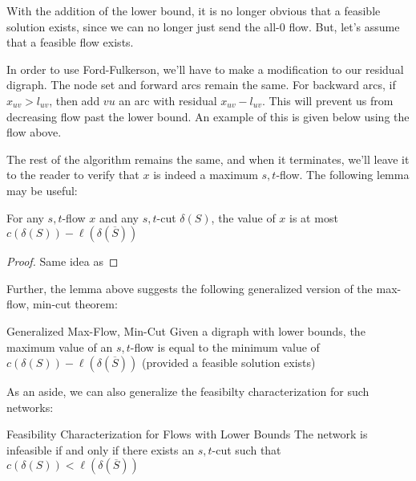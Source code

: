 With the addition of the lower bound, it is no longer obvious that a feasible solution exists, since we can no longer just send the all-$0$ flow.
But, let's assume that a feasible flow exists.

In order to use Ford-Fulkerson, we'll have to make a modification to our residual digraph.
The node set and forward arcs remain the same.
For backward arcs, if $x_{uv} > l_{uv}$, then add $vu$ an arc with residual $x_{uv} - l_{uv}$.
This will prevent us from decreasing flow past the lower bound.
An example of this is given below using the flow above.

\begin{minipage}{\textwidth}
    \centering
\end{minipage}

The rest of the algorithm remains the same, and when it terminates, we'll leave it to the reader to verify that $x$ is indeed a maximum $s,t$-flow.
The following lemma may be useful:
\begin{lemma}{}{}
    For any $s,t$-flow $x$ and any $s,t$-cut $\delta(S)$, the value of $x$ is at most $c(\delta(S)) - \ell(\delta(\overline{S}))$
\end{lemma}
\begin{proof}
    Same idea as 
\end{proof}

Further, the lemma above suggests the following generalized version of the max-flow, min-cut theorem:
\begin{theorem}{Generalized Max-Flow, Min-Cut}{}
    Given a digraph with lower bounds, the maximum value of an $s,t$-flow is equal to the minimum value of $c(\delta(S)) - \ell(\delta(\overline{S}))$ (provided a feasible solution exists)
\end{theorem}

As an aside, we can also generalize the feasibilty characterization for such networks:
\begin{theorem}{Feasibility Characterization for Flows with Lower Bounds}{}
    The network is infeasible if and only if there exists an $s,t$-cut such that $c(\delta(S)) < \ell(\delta(\overline{S}))$
\end{theorem}